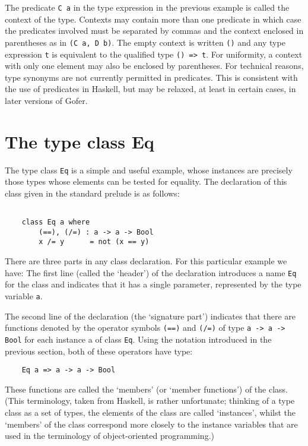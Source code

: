 The predicate \verb"C a" in the type expression in  the  previous  example  is
called the context of the type.  Contexts may  contain  more  than  one
predicate in which case the predicates involved must  be  separated  by
commas and the context enclosed in parentheses as in \verb"(C a, D b)".   The
empty context is written \verb"()" and any type expression \verb"t" 
is equivalent  to
the qualified type \verb"() => t".  For uniformity, a context  with  only  one
element may also be enclosed by parentheses.
For technical reasons, type synonyms are  not  currently  permitted  in
predicates.  This is consistent with the use of predicates in  Haskell,
but may be relaxed, at least in certain cases,  in  later  versions  of
Gofer.


\section{The type class Eq}
The type class \verb"Eq" is a simple and useful example, whose  instances  are
precisely those types whose elements can be tested for  equality.   The
declaration of this class given in the standard prelude is as follows:
\begin{verbatim}

    class Eq a where
        (==), (/=) : a -> a -> Bool
        x /= y      = not (x == y)
\end{verbatim}
There are three parts in any class declaration.   For  this  particular
example we have:
\BI
\IT  The first line (called the `header') of the declaration introduces
     a name \verb"Eq" for the  class  and  indicates  that  it  has  a  single
     parameter, represented by the type variable \verb"a".

\IT  The  second  line  of  the  declaration  (the  `signature   part')
     indicates that there are functions denoted by the operator symbols
     \verb"(==)" and \verb"(/=)" of type \verb"a -> a -> Bool" 
     for each instance a of  class
     \verb"Eq".  Using the notation introduced in the previous  section,  both
     of these operators have type:
\begin{verbatim}
    Eq a => a -> a -> Bool
\end{verbatim}
     These functions are called the `members' (or  `member  functions')
     of the class.  (This terminology, taken from  Haskell,  is  rather
     unfortunate; thinking of a type class  as  a  set  of  types,  the
     elements of the class are called `instances', whilst the `members'
     of the class correspond more closely  to  the  instance  variables
     that are used in the terminology of object-oriented programming.)

